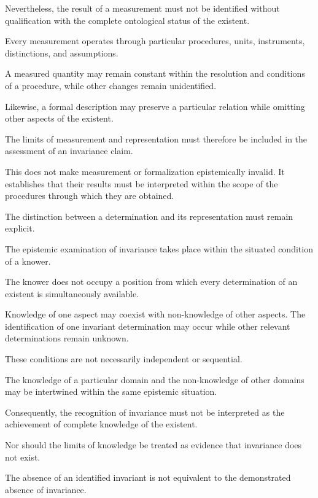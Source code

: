 Nevertheless, the result of
a measurement must not be
identified without qualification
with the complete ontological
status of the existent.

Every measurement operates
through particular procedures,
units, instruments, distinctions,
and assumptions.

A measured quantity may remain
constant within the resolution
and conditions of a procedure,
while other changes remain
unidentified.

Likewise, a formal description
may preserve a particular
relation while omitting other
aspects of the existent.

The limits of measurement and
representation must therefore
be included in the assessment
of an invariance claim.

This does not make measurement
or formalization epistemically
invalid. It establishes that
their results must be interpreted
within the scope of the procedures
through which they are obtained.

The distinction between a
determination and its representation
must remain explicit.


The epistemic examination of
invariance takes place within
the situated condition of a
knower.

The knower does not occupy
a position from which every
determination of an existent
is simultaneously available.

Knowledge of one aspect may
coexist with non-knowledge
of other aspects. The identification
of one invariant determination
may occur while other relevant
determinations remain unknown.

These conditions are not
necessarily independent or
sequential.

The knowledge of a particular
domain and the non-knowledge
of other domains may be
intertwined within the same
epistemic situation.

Consequently, the recognition
of invariance must not be
interpreted as the achievement
of complete knowledge of the
existent.

Nor should the limits of
knowledge be treated as evidence
that invariance does not exist.

The absence of an identified
invariant is not equivalent
to the demonstrated absence
of invariance.

